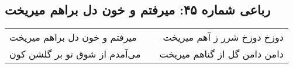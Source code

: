 \begin{center}
\section*{رباعی شماره ۴۵: میرفتم و خون دل براهم میریخت}
\label{sec:sh045}
\begin{longtable}{l p{0.5cm} r}
میرفتم و خون دل براهم میریخت
&&
دوزخ دوزخ شرر ز آهم میریخت
\\
می‌آمدم از شوق تو بر گلشن کون
&&
دامن دامن گل از گناهم میریخت
\\
\end{longtable}
\end{center}
